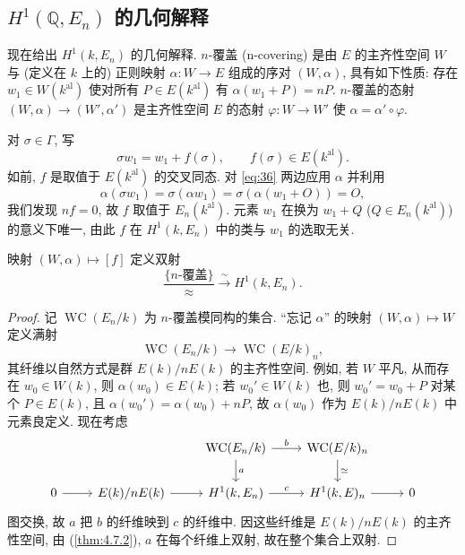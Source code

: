 \subsection*{$H^1(\mathbb{Q}, E_n)$ 的几何解释}

现在给出 $H^1(k, E_n)$ 的几何解释. $n$-覆盖 (n-covering) 是由 $E$ 的主齐性空间 $W$ 与 (定义在 $k$ 上的) 正则映射 $\alpha\colon W\to E$ 组成的序对 $(W, \alpha)$, 具有如下性质:
存在 $w_1\in W(k^{\mathrm{al}})$ 使对所有 $P\in E(k^{\mathrm{al}})$ 有 $\alpha(w_1 + P) = nP$.
$n$-覆盖的态射 $(W, \alpha)\to(W', \alpha')$ 是主齐性空间 $E$ 的态射 $\varphi\colon W\to W'$ 使 $\alpha = \alpha'\circ\varphi$.

对 $\sigma\in\Gamma$, 写
\begin{equation} \label{eq:36}
\sigma w_1 = w_1 + f(\sigma), \qquad f(\sigma)\in E(k^{\mathrm{al}}).
\tag{36}
\end{equation}
如前, $f$ 是取值于 $E(k^{\mathrm{al}})$ 的交叉同态. 对 \eqref{eq:36} 两边应用 $\alpha$ 并利用
\[
\alpha(\sigma w_1) = \sigma(\alpha w_1) = \sigma(\alpha(w_1 + O)) = O,
\]
我们发现 $nf = 0$, 故 $f$ 取值于 $E_n(k^{\mathrm{al}})$. 元素 $w_1$ 在换为 $w_1 + Q$ ($Q\in E_n(k^{\mathrm{al}})$) 的意义下唯一, 由此 $f$ 在 $H^1(k, E_n)$ 中的类与 $w_1$ 的选取无关.

\begin{theorem} \label{thm:4.7.10} 
映射 $(W, \alpha)\mapsto[f]$ 定义双射
\[
\dfrac{\{n\text{-覆盖}\}}{\approx}\xrightarrow{\ \sim\ }H^1(k, E_n).
\]
\end{theorem}

\begin{proof}
记 $\operatorname{WC}(E_n/k)$ 为 $n$-覆盖模同构的集合. ``忘记 $\alpha$'' 的映射 $(W, \alpha)\mapsto W$ 定义满射
\[
\operatorname{WC}(E_n/k)\to\operatorname{WC}(E/k)_n,
\]
其纤维以自然方式是群 $E(k)/nE(k)$ 的主齐性空间. 例如, 若 $W$ 平凡, 从而存在 $w_0\in W(k)$, 则 $\alpha(w_0)\in E(k)$; 若 $w_0'\in W(k)$ 也, 则 $w_0' = w_0 + P$ 对某个 $P\in E(k)$, 且 $\alpha(w_0') = \alpha(w_0) + nP$, 故 $\alpha(w_0)$ 作为 $E(k)/nE(k)$ 中元素良定义. 现在考虑
\[\begin{tikzcd}
	&& {\operatorname{WC}(E_n/k)} & {\operatorname{WC}(E/k)_n} & \\
	0 & {E(k)/nE(k)} & {H^1(k,E_n)} & {H^1(k, E)_n} & 0
	\arrow["b", from=1-3, to=1-4]
	\arrow["a", from=1-3, to=2-3]
	\arrow["\simeq", from=1-4, to=2-4]
	\arrow[from=2-1, to=2-2]
	\arrow[from=2-2, to=2-3]
	\arrow["c", from=2-3, to=2-4]
	\arrow[from=2-4, to=2-5]
\end{tikzcd}\]
图交换, 故 $a$ 把 $b$ 的纤维映到 $c$ 的纤维中. 因这些纤维是 $E(k)/nE(k)$ 的主齐性空间, 由 (\ref{thm:4.7.2}), $a$ 在每个纤维上双射, 故在整个集合上双射.
\end{proof}

